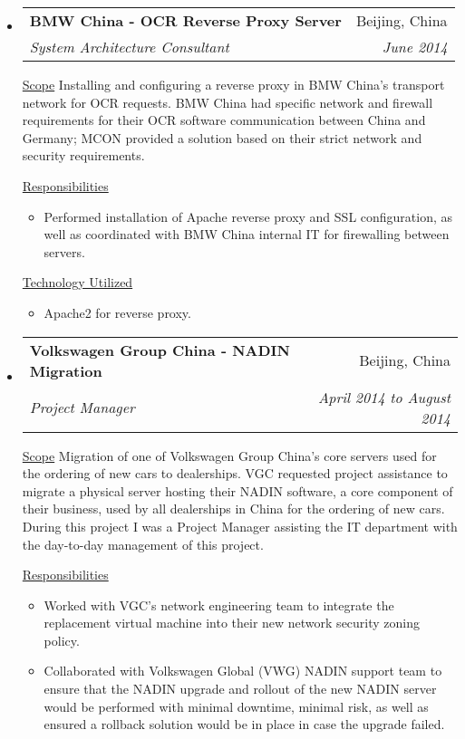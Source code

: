 \documentclass[a4paper,11pt]{article}
\makeatletter
\newcommand{\resitem}[1]{\item #1 \vspace{-2pt}}
\newcommand{\ressubheading}[4]{
\begin{tabular*}{6.5in}{l@{\cftdotfill{\cftsecdotsep}\extracolsep{\fill}}r}
        \textbf{#1} & #2 \\
        \textit{#3} & \textit{#4} \\
\end{tabular*}\vspace{-6pt}}
\makeatother
\begin{document}
\begin{itemize}

    \item
        \ressubheading{BMW China - OCR Reverse Proxy Server}{Beijing, China}{System Architecture Consultant}{June 2014}
        \linebreak
        \linebreak

        \underline{Scope}
        \linebreak
        \linebreak
        Installing and configuring a reverse proxy in BMW China's transport network for OCR requests. BMW China had specific network and firewall requirements for their OCR software communication between China and Germany; MCON provided a solution based on their strict network and security requirements.

        \underline{Responsibilities}
        \begin{itemize}
            \resitem{Performed installation of Apache reverse proxy and SSL configuration, as well as coordinated with BMW China internal IT for firewalling between servers.}
        \end{itemize}

        \underline{Technology Utilized}
        \begin{itemize}
            \resitem{Apache2 for reverse proxy.}
        \end{itemize}

    \item
        \ressubheading{Volkswagen Group China - NADIN Migration}{Beijing, China}{Project Manager}{April 2014 to August 2014}
        \linebreak
        \linebreak

        \underline{Scope}
        \linebreak
        \linebreak
        Migration of one of Volkswagen Group China's core servers used for the ordering of new cars to dealerships. VGC requested project assistance to migrate a physical server hosting their NADIN software, a core component of their business, used by all dealerships in China for the ordering of new cars. During this project I was a Project Manager assisting the IT department with the day-to-day management of this project.

        \underline{Responsibilities}
        \begin{itemize}
            \resitem{Worked with VGC's network engineering team to integrate the replacement virtual machine into their new network security zoning policy.}
            \resitem{Collaborated with Volkswagen Global (VWG) NADIN support team to ensure that the NADIN upgrade and rollout of the new NADIN server would be performed with minimal downtime, minimal risk, as well as ensured a rollback solution would be in place in case the upgrade failed.}
        \end{itemize}


\end{itemize}
\end{document}
